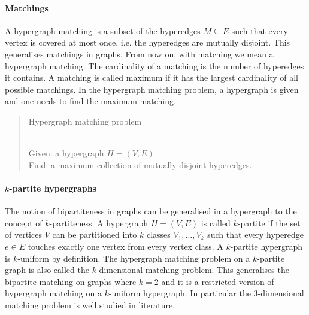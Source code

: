 \paragraph{Matchings} A hypergraph matching is a subset of the hyperedges $M \subseteq E$ such that every vertex is covered at most once, i.e. the hyperedges are mutually disjoint. This generalises matchings in graphs. From now on, with matching we mean a hypergraph matching. The cardinality of a matching is the number of hyperedges it contains. %
A matching is called maximum if it has the largest cardinality of all possible matchings. %
In the hypergraph matching problem, a hypergraph is given and one needs to find the maximum matching.
%
\begin{quote}
\begin{bf}Hypergraph matching problem\end{bf}\\
Given: a hypergraph $H = (V,E)$ \\
Find: a maximum collection of mutually disjoint hyperedges.
\end{quote}
%
\paragraph{$k$-partite hypergraphs}
The notion of bipartiteness in graphs can be generalised in a hypergraph to the concept of $k$-partiteness. A hypergraph $H = (V,E)$ is called $k$-partite if the set of vertices $V$ can be partitioned into $k$ classes $V_1, \ldots, V_k$ such that every hyperedge $e \in E$ touches exactly one vertex from every vertex class. A $k$-partite hypergraph is $k$-uniform by definition. The hypergraph matching problem on a $k$-partite graph is also called the $k$-dimensional matching problem. This generalises the bipartite matching on graphs where $k=2$ and it is a restricted version of hypergraph matching on a $k$-uniform hypergraph. In particular the 3-dimensional matching problem is well studied in literature. %

